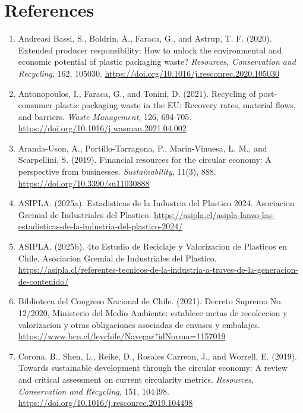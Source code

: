 \documentclass[review,10pt]{elsarticle}
\newcommand{\changepar}[1]{#1\par\medskip}
\begin{document}
\newpage

\section{References}

\begin{enumerate}[leftmargin=*]

\item \changepar{Andreasi Bassi, S., Boldrin, A., Faraca, G., and Astrup, T. F. (2020). Extended producer responsibility: How to unlock the environmental and economic potential of plastic packaging waste? \textit{Resources, Conservation and Recycling}, 162, 105030. \url{https://doi.org/10.1016/j.resconrec.2020.105030}}

\item \changepar{Antonopoulos, I., Faraca, G., and Tonini, D. (2021). Recycling of post-consumer plastic packaging waste in the EU: Recovery rates, material flows, and barriers. \textit{Waste Management}, 126, 694-705. \url{https://doi.org/10.1016/j.wasman.2021.04.002}}

\item \changepar{Aranda-Uson, A., Portillo-Tarragona, P., Marin-Vinuesa, L. M., and Scarpellini, S. (2019). Financial resources for the circular economy: A perspective from businesses. \textit{Sustainability}, 11(3), 888. \url{https://doi.org/10.3390/su11030888}}

\item \changepar{ASIPLA. (2025a). Estadisticas de la Industria del Plastico 2024. Asociacion Gremial de Industriales del Plastico. \url{https://asipla.cl/asipla-lanzo-las-estadisticas-de-la-industria-del-plastico-2024/}}

\item \changepar{ASIPLA. (2025b). 4to Estudio de Reciclaje y Valorizacion de Plasticos en Chile. Asociacion Gremial de Industriales del Plastico. \url{https://asipla.cl/referentes-tecnicos-de-la-industria-a-traves-de-la-generacion-de-contenido/}}

\item \changepar{Biblioteca del Congreso Nacional de Chile. (2021). Decreto Supremo No. 12/2020, Ministerio del Medio Ambiente: establece metas de recoleccion y valorizacion y otras obligaciones asociadas de envases y embalajes. \url{https://www.bcn.cl/leychile/Navegar?idNorma=1157019}}

\item \changepar{Corona, B., Shen, L., Reike, D., Rosales Carreon, J., and Worrell, E. (2019). Towards sustainable development through the circular economy: A review and critical assessment on current circularity metrics. \textit{Resources, Conservation and Recycling}, 151, 104498. \url{https://doi.org/10.1016/j.resconrec.2019.104498}}


\end{enumerate}
\end{document}

